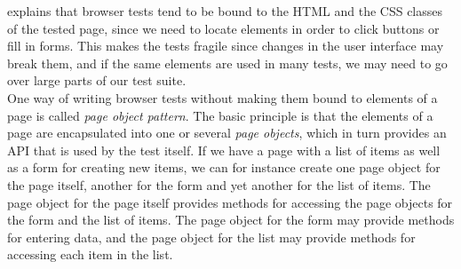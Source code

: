 \citet{web:page_object} explains that browser tests tend to be bound to
the HTML and the CSS classes of the tested page, since we need to locate
elements in order to click buttons or fill in forms. This makes the
tests fragile since changes in the user interface may break them, and if
the same elements are used in many tests, we may need to go over large
parts of our test suite.\\

One way of writing browser tests without making them bound to elements
of a page is called \emph{page object pattern}. The basic principle is
that the elements of a page are encapsulated into one or several
\emph{page objects}, which in turn provides an API that is used by the
test itself. If we have a page with a list of items as well as a form
for creating new items, we can for instance create one page object for
the page itself, another for the form and yet another for the list of
items. The page object for the page itself provides methods for
accessing the page objects for the form and the list of items. The page
object for the form may provide methods for entering data, and the page
object for the list may provide methods for accessing each item in the
list. \cite{web:page_object}

